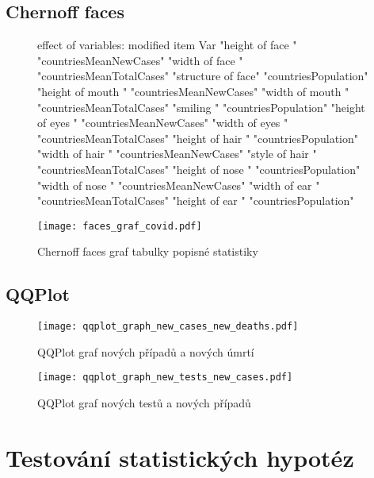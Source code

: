 \documentclass[a4paper, 12pt]{article}
\begin{document}
\subsection{Chernoff faces}
\begin{figure}[H]
\small
\centering

\begin{Schunk}
\begin{Soutput}
effect of variables:
 modified item       Var                      
 "height of face   " "countriesMeanNewCases"  
 "width of face    " "countriesMeanTotalCases"
 "structure of face" "countriesPopulation"    
 "height of mouth  " "countriesMeanNewCases"  
 "width of mouth   " "countriesMeanTotalCases"
 "smiling          " "countriesPopulation"    
 "height of eyes   " "countriesMeanNewCases"  
 "width of eyes    " "countriesMeanTotalCases"
 "height of hair   " "countriesPopulation"    
 "width of hair   "  "countriesMeanNewCases"  
 "style of hair   "  "countriesMeanTotalCases"
 "height of nose  "  "countriesPopulation"    
 "width of nose   "  "countriesMeanNewCases"  
 "width of ear    "  "countriesMeanTotalCases"
 "height of ear   "  "countriesPopulation"    
\end{Soutput}
\end{Schunk}
\texttt{[image: faces\_graf\_covid.pdf]}
\caption{Chernoff faces graf tabulky popisné statistiky}
\end{figure}
\clearpage

\subsection{QQPlot}
\begin{figure}[H]
\centering

\texttt{[image: qqplot\_graph\_new\_cases\_new\_deaths.pdf]}
\caption{QQPlot graf nových případů a nových úmrtí}

\texttt{[image: qqplot\_graph\_new\_tests\_new\_cases.pdf]}
\caption{QQPlot graf nových testů a nových případů}

\end{figure}
\clearpage

\section{Testování statistických hypotéz}
\end{document}
